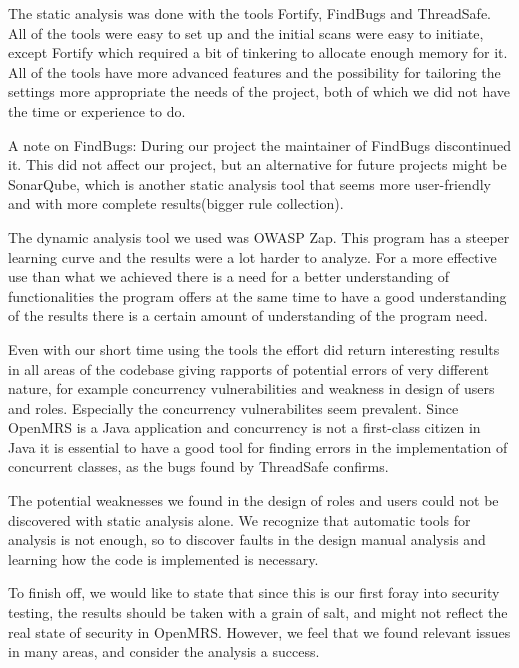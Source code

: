 \documentclass{report} %
\begin{document}
The static analysis was done with the tools Fortify, FindBugs and ThreadSafe.
All of the tools were easy to set up and the initial scans were easy to initiate,
except Fortify which required a bit of tinkering to allocate enough memory for it. All of the
tools have more advanced features and the possibility for tailoring the settings
more appropriate the needs of the project, both of which we did not have the
time or experience to do. 

A note on FindBugs: During our project the maintainer of FindBugs discontinued
it. This did not affect our project, but an alternative for future projects
might be SonarQube, which is another static analysis tool that seems more
user-friendly and with more complete results(bigger rule collection).

The dynamic analysis tool we used was OWASP Zap. This program has a steeper
learning curve and the results were a lot harder to analyze. For a more
effective use than what we achieved there is a need for a better understanding
of functionalities the program offers at the same time to have a good
understanding of the results there is a certain amount of understanding of
the program need.

Even with our short time using the tools the effort did return interesting
results in all areas of the codebase giving rapports of potential errors of
very different nature, for example concurrency vulnerabilities and weakness in
design of users and roles. Especially the concurrency vulnerabilites seem
prevalent. Since OpenMRS is a Java application and concurrency is not a first-class 
citizen in Java it is essential to have a good tool for finding errors in the
implementation of concurrent classes, as the bugs found by ThreadSafe confirms.

The potential weaknesses we found in the design of roles and users could not be
discovered with static analysis alone. We recognize that automatic tools for
analysis is not enough, so to discover faults in the design manual analysis and
learning how the code is implemented is necessary.

To finish off, we would like to state that since this is our first foray into
security testing, the results should be taken with a grain of salt, and might
not reflect the real state of security in OpenMRS. However, we feel that we
found relevant issues in many areas, and consider the analysis a success.
\end{document}
